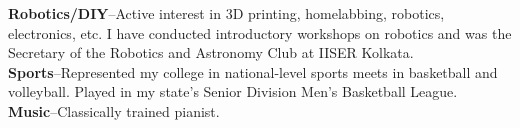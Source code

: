 \documentclass[10pt,a4paper]{article}
\begin{document}
	  \textbf{Robotics/DIY}--Active interest in 3D printing,
     homelabbing, robotics, electronics, etc. I have conducted introductory
     workshops on robotics and was the Secretary of the Robotics and Astronomy
     Club at IISER Kolkata.\\
	  \textbf{Sports}--Represented my college in national-level sports
     meets in basketball and volleyball. Played in my state's Senior Division
     Men's Basketball League.\\
	  \textbf{Music}--Classically trained pianist.\\

\spacedhrule{1em}{-0.4em}

%
%
\end{document}
